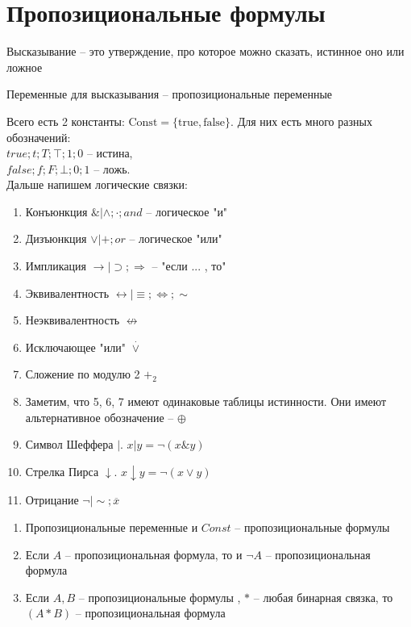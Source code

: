 \documentclass[main]{subfiles}
\begin{document}
\chapter{Пропозициональные формулы}
\begin{definition}
    Высказывание -- это утверждение, про которое можно сказать, истинное оно или ложное
\end{definition}
\begin{definition}
    Переменные для высказывания  -- пропозициональные переменные
\end{definition}
Всего есть 2 константы: $\text{Const} = \{\text{true}, \text{false}\}$.
Для них есть много разных обозначений:\\
$true; t; T; \top; 1; 0$ -- истина, \\
$false; f; F; \bot; 0; 1$ -- ложь.\\
Дальше напишем логические связки:
\begin{enumerate}
    \item Конъюнкция $\& | \land ; \cdot ; and $ -- логическое "и"
    \item Дизъюнкция $\lor | +; or$ --  логическое "или"
    \item Импликация $\to | \supset ; \Rightarrow$ -- "если ... , то"
    \item Эквивалентность $\leftrightarrow | \equiv ; \Leftrightarrow ; \sim$
    \item Неэквивалентность $\not\leftrightarrow$
    \item Исключающее "или" $\stackrel{\cdot}{\lor}$
    \item Сложение по модулю 2 $+_2$
    \item Заметим, что 5, 6, 7 имеют одинаковые таблицы истинности. Они имеют 
    альтернативное обозначение -- $\oplus$
    \item Символ Шеффера $ |$.   $x|y = \lnot(x\&y)$
    \item Стрелка Пирса $\downarrow$.   $x\downarrow y = \lnot(x\lor y)$
    \item Отрицание $\lnot | \sim; \overline{x}$
\end{enumerate}
\begin{definition}
    \begin{enumerate}
        \item Пропозициональные переменные и $Const$ -- 
        пропозициональные формулы
        \item Если $A$ -- пропозициональная
        формула, то и $\lnot A$ -- пропозициональная формула
        \item Если $A, B$ -- пропозициональные формулы , $*$ -- любая бинарная
         связка, то $(A * B)$ -- пропозициональная формула
    \end{enumerate}
\end{definition}
\end{document}
